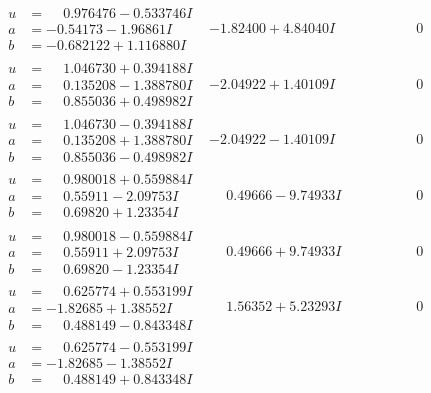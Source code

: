 \documentclass[1p]{elsarticle_modified}
\theoremstyle{definition}
\begin{document}
$$\begin{array}{c|c|c}
\begin{aligned}
u &= \phantom{-}0.976476 - 0.533746 I \\
a &= -0.54173 - 1.96861 I \\
b &= -0.682122 + 1.116880 I\end{aligned}
 & -1.82400 + 4.84040 I & \phantom{-0.000000 } 0 \\ \hline\begin{aligned}
u &= \phantom{-}1.046730 + 0.394188 I \\
a &= \phantom{-}0.135208 - 1.388780 I \\
b &= \phantom{-}0.855036 + 0.498982 I\end{aligned}
 & -2.04922 + 1.40109 I & \phantom{-0.000000 } 0 \\ \hline\begin{aligned}
u &= \phantom{-}1.046730 - 0.394188 I \\
a &= \phantom{-}0.135208 + 1.388780 I \\
b &= \phantom{-}0.855036 - 0.498982 I\end{aligned}
 & -2.04922 - 1.40109 I & \phantom{-0.000000 } 0 \\ \hline\begin{aligned}
u &= \phantom{-}0.980018 + 0.559884 I \\
a &= \phantom{-}0.55911 - 2.09753 I \\
b &= \phantom{-}0.69820 + 1.23354 I\end{aligned}
 & \phantom{-}0.49666 - 9.74933 I & \phantom{-0.000000 } 0 \\ \hline\begin{aligned}
u &= \phantom{-}0.980018 - 0.559884 I \\
a &= \phantom{-}0.55911 + 2.09753 I \\
b &= \phantom{-}0.69820 - 1.23354 I\end{aligned}
 & \phantom{-}0.49666 + 9.74933 I & \phantom{-0.000000 } 0 \\ \hline\begin{aligned}
u &= \phantom{-}0.625774 + 0.553199 I \\
a &= -1.82685 + 1.38552 I \\
b &= \phantom{-}0.488149 - 0.843348 I\end{aligned}
 & \phantom{-}1.56352 + 5.23293 I & \phantom{-0.000000 } 0 \\ \hline\begin{aligned}
u &= \phantom{-}0.625774 - 0.553199 I \\
a &= -1.82685 - 1.38552 I \\
b &= \phantom{-}0.488149 + 0.843348 I\end{aligned}

\end{array}$$
\end{document}
